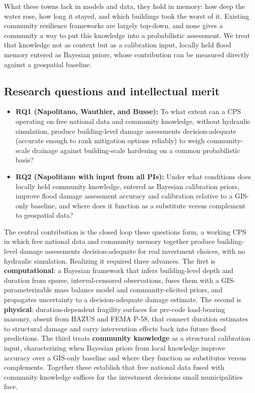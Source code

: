 \documentclass[11pt]{article}
\begin{document}
What these towns lack in models and data, they hold in memory: how deep the water
rose, how long it stayed, and which buildings took the worst of it. Existing
community resilience frameworks are largely top-down, and none gives a community
a way to put this knowledge into a probabilistic assessment.
We treat that knowledge not as context but as a calibration input, locally held
flood memory entered as Bayesian priors, whose contribution can be measured
directly against a geospatial baseline.

\vspace{-10pt}
\subsection{Research questions and intellectual merit}

\begin{itemize}[leftmargin=1.5em,itemsep=0pt]
\item \textbf{RQ1 (Napolitano, Wauthier, and Busse):} To what extent can a CPS
operating on free national data and community knowledge, without hydraulic
simulation, produce building-level damage assessments decision-adequate (accurate enough to
rank mitigation options reliably) to weigh
community-scale drainage against building-scale hardening on a common probabilistic
basis?
\item \textbf{RQ2 (Napolitano with input from all PIs):} Under what conditions does locally
held community knowledge, entered as Bayesian calibration priors, improve flood
damage assessment accuracy and calibration relative to a GIS-only baseline, and
where does it function as a substitute versus complement to geospatial data?
\end{itemize}

The central contribution is the closed loop these questions form, a working CPS
in which free national data and community memory together produce building-level
damage assessments decision-adequate for real investment choices, with no hydraulic
simulation. Realizing it required three advances. The first is
\textbf{computational}: a Bayesian framework that infers building-level depth and
duration from sparse, interval-censored observations, fuses them with a
GIS-parameterizable mass balance model and community-elicited priors, and
propagates uncertainty to a decision-adequate damage estimate. The second is
\textbf{physical}: duration-dependent fragility surfaces for pre-code
load-bearing masonry, absent from HAZUS and FEMA P-58, that connect
duration estimates to structural damage and carry intervention effects
back into future flood predictions. The third treats \textbf{community knowledge} as a
structural calibration input, characterizing when Bayesian priors from local
knowledge improve accuracy over a GIS-only baseline and where they function as
substitutes versus complements. Together these establish that free national data
fused with community knowledge suffices for the investment decisions small
municipalities face.
\end{document}
